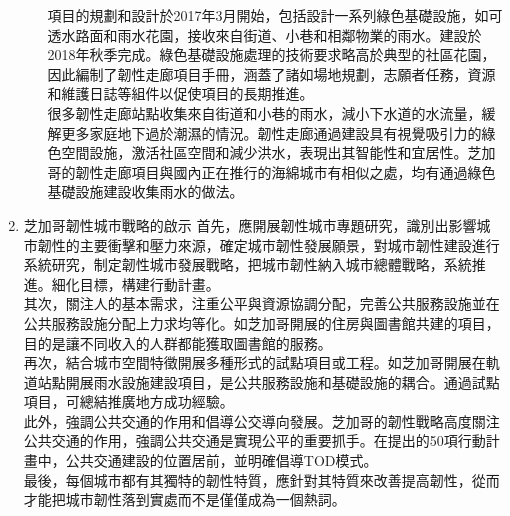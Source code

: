 \documentclass[a4paper,12pt]{article}
\begin{document}
\begin{enumerate}
\begin{enumerate}
項目的規劃和設計於2017年3月開始，包括設計一系列綠色基礎設施，如可透水路面和雨水花園，接收來自街道、小巷和相鄰物業的雨水。建設於2018年秋季完成。綠色基礎設施處理的技術要求略高於典型的社區花園，因此編制了韌性走廊項目手冊，涵蓋了諸如場地規劃，志願者任務，資源和維護日誌等組件以促使項目的長期推進。\\
很多韌性走廊站點收集來自街道和小巷的雨水，減小下水道的水流量，緩解更多家庭地下過於潮濕的情況。韌性走廊通過建設具有視覺吸引力的綠色空間設施，激活社區空間和減少洪水，表現出其智能性和宜居性。芝加哥的韌性走廊項目與國內正在推行的海綿城市有相似之處，均有通過綠色基礎設施建設收集雨水的做法。\\
\end{enumerate}
\item 芝加哥韌性城市戰略的啟示
\label{sec:org0c9e55c}
首先，應開展韌性城市專題研究，識別出影響城市韌性的主要衝擊和壓力來源，確定城市韌性發展願景，對城市韌性建設進行系統研究，制定韌性城市發展戰略，把城市韌性納入城市總體戰略，系統推進。細化目標，構建行動計畫。\\

其次，關注人的基本需求，注重公平與資源協調分配，完善公共服務設施並在公共服務設施分配上力求均等化。如芝加哥開展的住房與圖書館共建的項目，目的是讓不同收入的人群都能獲取圖書館的服務。\\

再次，結合城市空間特徵開展多種形式的試點項目或工程。如芝加哥開展在軌道站點開展雨水設施建設項目，是公共服務設施和基礎設施的耦合。通過試點項目，可總結推廣地方成功經驗。\\

此外，強調公共交通的作用和倡導公交導向發展。芝加哥的韌性戰略高度關注公共交通的作用，強調公共交通是實現公平的重要抓手。在提出的50項行動計畫中，公共交通建設的位置居前，並明確倡導TOD模式。\\

最後，每個城市都有其獨特的韌性特質，應針對其特質來改善提高韌性，從而才能把城市韌性落到實處而不是僅僅成為一個熱詞。\\
\end{enumerate}
\end{document}
